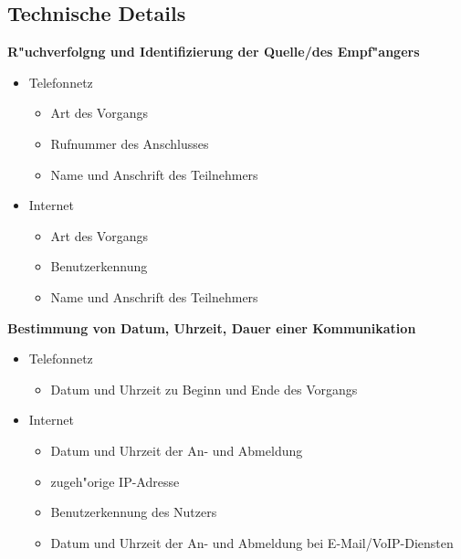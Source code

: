   \subsection{Technische Details}

    \begin{frame}
      \textbf{R"uchverfolgng und Identifizierung der Quelle/des Empf"angers}
      \begin{itemize}
        \item Telefonnetz
        \begin{itemize}
          \item Art des Vorgangs
          \item Rufnummer des Anschlusses
          \item Name und Anschrift des Teilnehmers
        \end{itemize}
        \item Internet
        \begin{itemize}
          \item Art des Vorgangs
          \item Benutzerkennung
          \item Name und Anschrift des Teilnehmers
        \end{itemize}
      \end{itemize}
    \end{frame}

    \begin{frame}
      \textbf{Bestimmung von Datum, Uhrzeit, Dauer einer Kommunikation}
      \begin{itemize}
        \item Telefonnetz
        \begin{itemize}
          \item Datum und Uhrzeit zu Beginn und Ende des Vorgangs
        \end{itemize}
        \item Internet
        \begin{itemize}
          \item Datum und Uhrzeit der An- und Abmeldung
          \item zugeh"orige IP-Adresse
          \item Benutzerkennung des Nutzers
          \item Datum und Uhrzeit der An- und Abmeldung bei E-Mail/VoIP-Diensten
        \end{itemize}
      \end{itemize}
    \end{frame}

